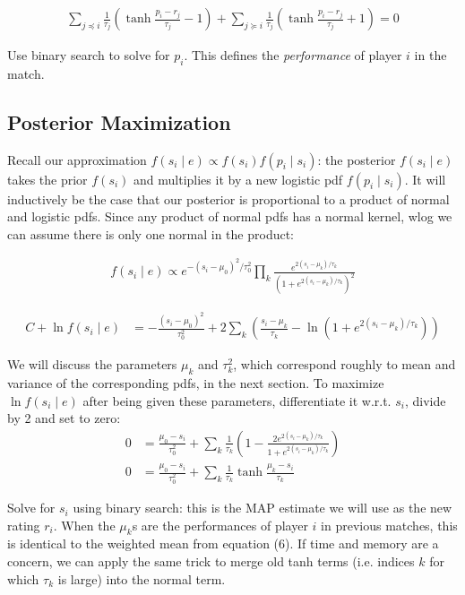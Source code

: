 \documentclass{article}
\begin{document}
\begin{align}
\sum_{j\preceq i}\frac{1}{\tau_j}\left( \tanh\frac {p_i - r_j} {\tau_j} - 1 \right) + \sum_{j\succeq i}\frac{1}{\tau_j}\left( \tanh\frac {p_i - r_j} {\tau_j} + 1 \right) = 0
\end{align}

Use binary search to solve for $p_i$. This defines the \emph{performance} of player $i$ in the match.

\subsection{Posterior Maximization}

Recall our approximation $f(s_i\mid e) \propto f(s_i)f(p_i\mid s_i)$: the posterior $f(s_i \mid e)$ takes the prior $f(s_i)$ and multiplies it by a new logistic pdf $f(p_i\mid s_i)$. It will inductively be the case that our posterior is proportional to a product of normal and logistic pdfs. Since any product of normal pdfs has a normal kernel, wlog we can assume there is only one normal in the product:

\begin{align}
f(s_i\mid e) \propto e^{-(s_i-\mu_0)^2/\tau_0^2} \prod_k \frac { e^{2(s_i-\mu_k)/\tau_k} } { \left(1 + e^{2(s_i-\mu_k)/\tau_k} \right)^2 }
\end{align}

\begin{align}
C + \ln f(s_i \mid e) &= -\frac{(s_i-\mu_0)^2}{\tau_0^2} + 2\sum_k \left( \frac{s_i-\mu_k}{\tau_k} - \ln(1 + e^{2(s_i-\mu_k)/\tau_k}) \right)
\end{align}

We will discuss the parameters $\mu_k$ and $\tau_k^2$, which correspond roughly to mean and variance of the corresponding pdfs, in the next section. To maximize $\ln f(s_i \mid e)$ after being given these parameters, differentiate it w.r.t. $s_i$, divide by 2 and set to zero:
\begin{align}
0 &= \frac{\mu_0-s_i}{\tau_0^2} + \sum_k \frac{1}{\tau_k}\left( 1 - \frac {2e^{2(s_i-\mu_k)/\tau_k}} {1 + e^{2(s_i-\mu_k)/\tau_k}} \right)
\\0 &=  \frac{\mu_0-s_i}{\tau_0^2} + \sum_k \frac{1}{\tau_k} \tanh \frac {\mu_k-s_i} {\tau_k}
\end{align}

Solve for $s_i$ using binary search: this is the MAP estimate we will use as the new rating $r_i$. When the $\mu_k$s are the performances of player $i$ in previous matches, this is identical to the weighted mean from equation (6). If time and memory are a concern, we can apply the same trick to merge old tanh terms (i.e. indices $k$ for which $\tau_k$ is large) into the normal term.
\end{document}
